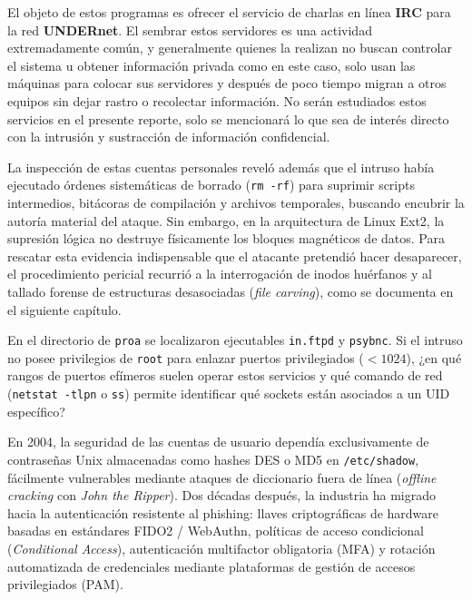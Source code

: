 \vspace{1em}

 El objeto de estos programas es ofrecer el servicio de charlas en línea \textbf{IRC} para la red
\textbf{UNDERnet}. El sembrar estos servidores es una actividad extremadamente común, 
y generalmente quienes la realizan no buscan controlar el sistema u obtener
información privada como en este caso, solo usan las máquinas para
colocar sus servidores y después de poco tiempo migran a otros equipos
sin dejar rastro o recolectar información. No serán estudiados
estos servicios en el presente reporte, solo se mencionará lo que sea de interés
directo con la intrusión y sustracción de información confidencial.

La inspección de estas cuentas personales reveló además que el intruso había ejecutado órdenes sistemáticas de borrado (\texttt{rm -rf}) para suprimir scripts intermedios, bitácoras de compilación y archivos temporales, buscando encubrir la autoría material del ataque. Sin embargo, en la arquitectura de Linux Ext2, la supresión lógica no destruye físicamente los bloques magnéticos de datos. Para rescatar esta evidencia indispensable que el atacante pretendió hacer desaparecer, el procedimiento pericial recurrió a la interrogación de inodos huérfanos y al tallado forense de estructuras desasociadas (\textit{file carving}), como se documenta en el siguiente capítulo.

\begin{retoforense}
En el directorio de \texttt{proa} se localizaron ejecutables \texttt{in.ftpd} y \texttt{psybnc}. Si el intruso no posee privilegios de \texttt{root} para enlazar puertos privilegiados ($< 1024$), ¿en qué rangos de puertos efímeros suelen operar estos servicios y qué comando de red (\texttt{netstat -tlpn} o \texttt{ss}) permite identificar qué sockets están asociados a un UID específico?
\end{retoforense}

\begin{perspectiva20}
En 2004, la seguridad de las cuentas de usuario dependía exclusivamente de contraseñas Unix almacenadas como hashes DES o MD5 en \texttt{/etc/shadow}, fácilmente vulnerables mediante ataques de diccionario fuera de línea (\textit{offline cracking} con \textit{John the Ripper}). Dos décadas después, la industria ha migrado hacia la autenticación resistente al phishing: llaves criptográficas de hardware basadas en estándares FIDO2 / WebAuthn, políticas de acceso condicional (\textit{Conditional Access}), autenticación multifactor obligatoria (MFA) y rotación automatizada de credenciales mediante plataformas de gestión de accesos privilegiados (PAM).
\end{perspectiva20}

